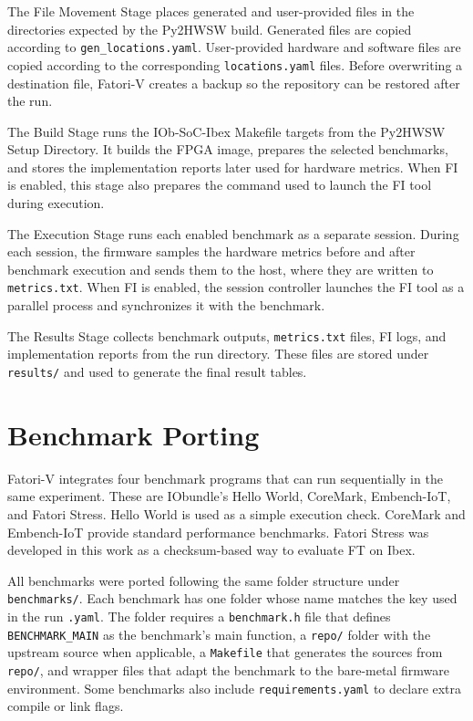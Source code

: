 The File Movement Stage places generated and user-provided files in the directories expected by the Py2HWSW build. Generated files are copied according to \texttt{gen\_locations.yaml}. User-provided hardware and software files are copied according to the corresponding \texttt{locations.yaml} files. Before overwriting a destination file, \ac{Fatori-V} creates a backup so the repository can be restored after the run.

The Build Stage runs the IOb-\ac{SoC}-Ibex Makefile targets from the Py2HWSW Setup Directory. It builds the \ac{FPGA} image, prepares the selected benchmarks, and stores the implementation reports later used for hardware metrics. When \ac{FI} is enabled, this stage also prepares the command used to launch the \ac{FI} tool during execution.

The Execution Stage runs each enabled benchmark as a separate session. During each session, the firmware samples the hardware metrics before and after benchmark execution and sends them to the host, where they are written to \texttt{metrics.txt}. When \ac{FI} is enabled, the session controller launches the \ac{FI} tool as a parallel process and synchronizes it with the benchmark.

The Results Stage collects benchmark outputs, \texttt{metrics.txt} files, \ac{FI} logs, and implementation reports from the run directory. These files are stored under \texttt{results/} and used to generate the final result tables.









\section{Benchmark Porting}
\label{chap7:benchmarks}

\ac{Fatori-V} integrates four benchmark programs that can run sequentially in the same experiment. These are IObundle's Hello World, CoreMark, Embench-IoT, and Fatori Stress. Hello World is used as a simple execution check. CoreMark and Embench-IoT provide standard performance benchmarks. Fatori Stress was developed in this work as a checksum-based way to evaluate \ac{FT} on Ibex.

All benchmarks were ported following the same folder structure under \texttt{benchmarks/}. Each benchmark has one folder whose name matches the key used in the run \texttt{.yaml}. The folder requires a \texttt{benchmark.h} file that defines \texttt{BENCHMARK\_MAIN} as the benchmark's main function, a \texttt{repo/} folder with the upstream source when applicable, a \texttt{Makefile} that generates the sources from \texttt{repo/}, and wrapper files that adapt the benchmark to the bare-metal firmware environment. Some benchmarks also include \texttt{requirements.yaml} to declare extra compile or link flags.


